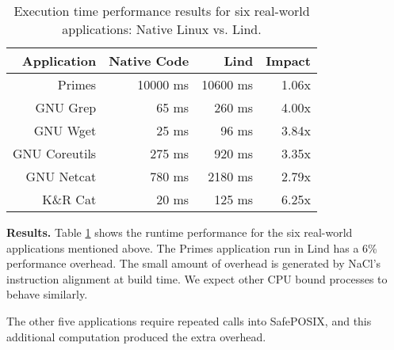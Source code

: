 {{{\begin{table}
\centering
\scriptsize
\begin{tabular}{|r|r|r|r|}
  \hline
  {\bf Application} & {\bf Native Code} & {\bf Lind} & {\bf Impact}  \\
  \hline
  Primes & 10000 ms & 10600 ms & 1.06x \\
  GNU Grep & 65 ms & 260 ms & 4.00x \\
  GNU Wget & 25 ms & 96 ms & 3.84x \\
  GNU Coreutils & 275 ms & 920 ms & 3.35x \\
  GNU Netcat & 780 ms & 2180 ms & 2.79x \\
  K\&R Cat & 20 ms & 125 ms & 6.25x \\
  \hline
\end{tabular}
\caption{\small Execution time performance results for six real-world applications: Native
Linux vs. Lind.}
\label{table:performance_apps}
\end{table}

\noindent
\textbf{Results.}
Table \ref{table:performance_apps} shows the runtime performance
for the six real-world applications mentioned above.
The Primes application run in Lind has a 6\% performance overhead.
The small amount of overhead is generated by NaCl's instruction alignment at build time.
We expect other CPU bound processes to behave similarly.

The other five applications
require repeated calls into SafePOSIX, and this additional 
computation produced the extra overhead.

}}}
